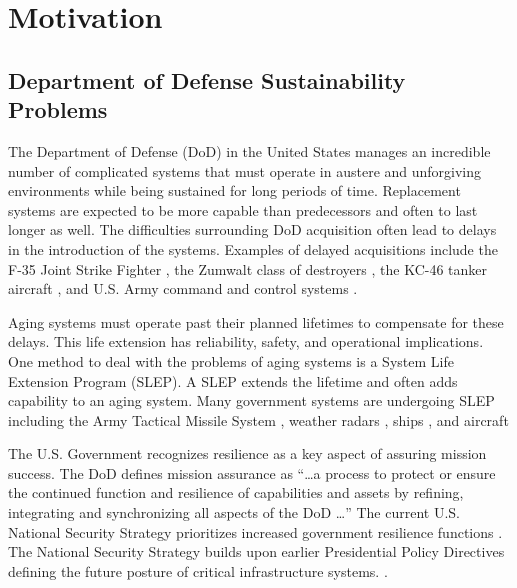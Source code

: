 \documentclass[preprint,12pt]{elsarticle}
\begin{document}
\linenumbers

\section{Motivation}
\label{S:1}

\subsection{Department of Defense Sustainability Problems}

The Department of Defense (DoD) in the United States manages an
incredible number of complicated systems that must operate in austere
and unforgiving environments while being sustained for long periods of
time. Replacement systems are expected to be more capable than
predecessors and often to last longer as well. The difficulties
surrounding DoD acquisition often lead to delays in 
the introduction of the systems. Examples of delayed acquisitions
include the F-35 Joint Strike Fighter
\cite{Werner2018}, the Zumwalt class of destroyers \cite{Katz2018},
the KC-46 tanker aircraft \cite{Mehta2016}, and U.S. Army command and
control systems \cite{Edwards2017}.

Aging systems must operate past
their planned lifetimes to compensate for these delays. This life extension has
reliability, safety, and operational implications. One method to deal
with the problems of aging systems is a System Life Extension
Program (SLEP). A SLEP extends the lifetime and often adds capability
to an aging system. Many government systems are undergoing SLEP including the Army
Tactical Missile System \cite{DOTE2017,zacks2015}, weather radars
\cite{ROC2018}, ships 
\cite{eckstein2018,NAVSEA2018}, and aircraft
\cite{Lockheed2017,Garbarino2018,Tirpak2015,jennings2018}

The U.S. Government recognizes resilience as a key aspect of assuring
mission success.  The DoD
defines mission assurance as ``\ldots a process to 
protect or ensure the continued function and resilience of
capabilities and assets by refining, integrating and synchronizing all
aspects of the DoD \ldots'' \cite{DepartmentofDefense2016a} The
current U.S. National Security  
Strategy prioritizes increased government resilience functions
\cite{Trump2017}. The National Security Strategy builds upon
earlier Presidential Policy Directives defining the future posture of
critical infrastructure systems. \citep{PPD8,PPD21}. 
\end{document}

